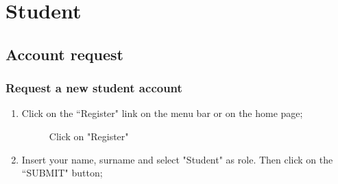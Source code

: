 \documentclass[ManualeUtente]{subfiles}
\begin{document}
\chapter{Student}
\section{Account request}
\subsection{Request a new student account}
\begin{enumerate}
	\item Click on the \textquotedblleft Register" link on the menu bar or on the home page;
	\begin{figure}[H]
		\centering
		\caption{Click on "Register"}
		\label{fig:Click on "Register"}
	\end{figure}
\newpage
	\item Insert your name, surname and select "Student" as role. Then click on the \textquotedblleft SUBMIT" button;
	\begin{figure}[H]
		\centering

\end{figure}
\end{enumerate}
\end{document}
